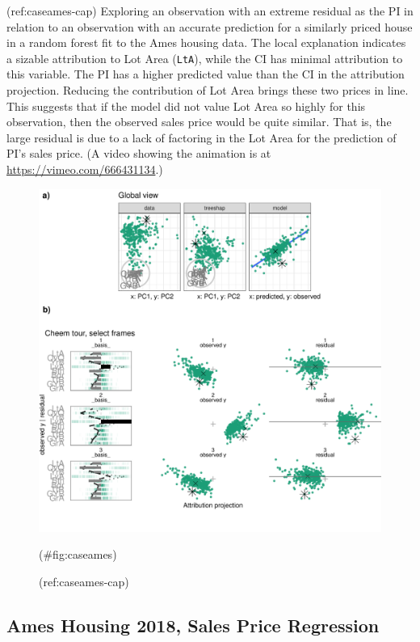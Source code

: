 \documentclass[
]{jss}
\begin{document}
(ref:caseames-cap) Exploring an observation with an extreme residual as the PI in relation to an observation with an accurate prediction for a similarly priced house in a random forest fit to the Ames housing data. The local explanation indicates a sizable attribution to Lot Area (\texttt{LtA}), while the CI has minimal attribution to this variable. The PI has a higher predicted value than the CI in the attribution projection. Reducing the contribution of Lot Area brings these two prices in line. This suggests that if the model did not value Lot Area so highly for this observation, then the observed sales price would be quite similar. That is, the large residual is due to a lack of factoring in the Lot Area for the prediction of PI's sales price. (A video showing the animation is at \url{https://vimeo.com/666431134}.)

\begin{CodeChunk}
\begin{figure}

{\centering \includegraphics[width=0.9\linewidth]{./figures/case_ames2018} 

}

\caption[(ref:caseames-cap)]{(ref:caseames-cap)}(\#fig:caseames)
\end{figure}
\end{CodeChunk}

\hypertarget{ames-housing-2018-sales-price-regression}{%
\subsection{Ames Housing 2018, Sales Price Regression}\label{ames-housing-2018-sales-price-regression}}
\end{document}
